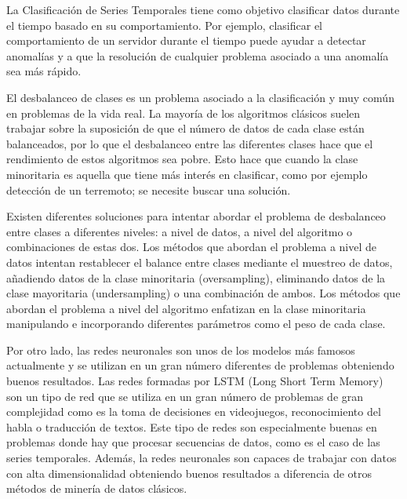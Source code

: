 La Clasificación de Series Temporales tiene como objetivo clasificar datos durante el tiempo basado en su comportamiento. Por ejemplo, clasificar el comportamiento de un servidor durante el tiempo puede ayudar a detectar anomalías y a que la resolución de cualquier problema asociado a una anomalía sea más rápido.\newline

El desbalanceo de clases es un problema asociado a la clasificación y muy común en problemas de la vida real. La mayoría de los algoritmos clásicos suelen trabajar sobre la suposición de que el número de datos de cada clase están balanceados, por lo que el desbalanceo entre las diferentes clases hace que el rendimiento de estos algoritmos sea pobre. Esto hace que cuando la clase minoritaria es aquella que tiene más interés en clasificar, como por ejemplo detección de un terremoto; se necesite buscar una solución.\newline

Existen diferentes soluciones para intentar abordar el problema de desbalanceo entre clases a diferentes niveles: a nivel de datos, a nivel del algoritmo o combinaciones de estas dos. Los métodos que abordan el problema a nivel de datos intentan restablecer el balance entre clases mediante el muestreo de datos, añadiendo datos de la clase minoritaria (oversampling), eliminando datos de la clase mayoritaria (undersampling) o una combinación de ambos. Los métodos que abordan el problema a nivel del algoritmo enfatizan en la clase minoritaria manipulando e incorporando diferentes parámetros como el peso de cada clase.\newline

Por otro lado, las redes neuronales son unos de los modelos más famosos actualmente \cite{chung2015gated} \cite{cho2014properties} \cite{karim2017lstm} \cite{swapna2018automated} y se utilizan en un gran número diferentes de problemas obteniendo buenos resultados. Las redes formadas por LSTM (Long Short Term Memory) son un tipo de red que se utiliza en un gran número de problemas de gran complejidad como es la toma de decisiones en videojuegos, reconocimiento del habla o traducción de textos. Este tipo de redes son especialmente buenas en problemas donde hay que procesar secuencias de datos, como  es el caso de las series temporales. Además, la redes neuronales son capaces de trabajar con datos con alta dimensionalidad obteniendo buenos resultados a diferencia de otros métodos de minería de datos clásicos.\newline

